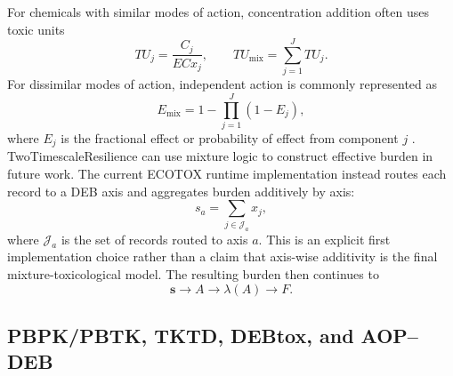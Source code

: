 For chemicals with similar modes of action, concentration addition often uses toxic units
\begin{equation}
  TU_j=\frac{C_j}{ECx_j},
  \qquad
  TU_{\mathrm{mix}}=\sum_{j=1}^J TU_j.
\end{equation}
For dissimilar modes of action, independent action is commonly represented as
\begin{equation}
  E_{\mathrm{mix}}=1-\prod_{j=1}^J(1-E_j),
\end{equation}
where $E_j$ is the fractional effect or probability of effect from component $j$ \citep{bopp2019mixtures,kienzler2017mixtures}. TwoTimescaleResilience can use mixture logic to construct effective burden in future work. The current ECOTOX runtime implementation instead routes each record to a DEB axis and aggregates burden additively by axis:
\begin{equation}
  s_a=\sum_{j\in\mathcal{J}_a} x_j,
\end{equation}
where $\mathcal{J}_a$ is the set of records routed to axis $a$. This is an explicit first implementation choice rather than a claim that axis-wise additivity is the final mixture-toxicological model. The resulting burden then continues to
\begin{equation}
  \mathbf{s}\rightarrow A\rightarrow\lambda(A)\rightarrow F.
\end{equation}

\subsection{PBPK/PBTK, TKTD, DEBtox, and AOP--DEB}

